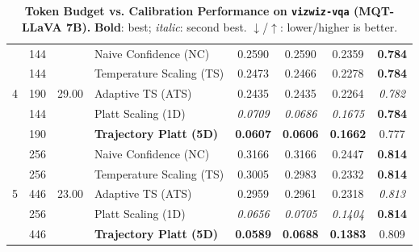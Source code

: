 \begin{table}[t]
\begin{tabular}{ccclcccc}
\multirow{5}{*}{4} & 144 & \multirow{5}{*}{29.00} & Naive Confidence (NC) & 0.2590 & 0.2590 & 0.2359 & \textbf{0.784} \\
 & 144 &  & Temperature Scaling (TS) & 0.2473 & 0.2466 & 0.2278 & \textbf{0.784} \\
 & 190 &  & Adaptive TS (ATS) & 0.2435 & 0.2435 & 0.2264 & \textit{0.782} \\
 & 144 &  & Platt Scaling (1D) & \textit{0.0709} & \textit{0.0686} & \textit{0.1675} & \textbf{0.784} \\
 & 190 &  & \textbf{Trajectory Platt (5D)} & \textbf{0.0607} & \textbf{0.0606} & \textbf{0.1662} & 0.777 \\
\midrule
\multirow{5}{*}{5} & 256 & \multirow{5}{*}{23.00} & Naive Confidence (NC) & 0.3166 & 0.3166 & 0.2447 & \textbf{0.814} \\
 & 256 &  & Temperature Scaling (TS) & 0.3005 & 0.2983 & 0.2332 & \textbf{0.814} \\
 & 446 &  & Adaptive TS (ATS) & 0.2959 & 0.2961 & 0.2318 & \textit{0.813} \\
 & 256 &  & Platt Scaling (1D) & \textit{0.0656} & \textit{0.0705} & \textit{0.1404} & \textbf{0.814} \\
 & 446 &  & \textbf{Trajectory Platt (5D)} & \textbf{0.0589} & \textbf{0.0688} & \textbf{0.1383} & 0.809 \\
\bottomrule
\end{tabular}
\caption{\textbf{Token Budget vs. Calibration Performance on \texttt{vizwiz-vqa} (MQT-LLaVA 7B).} \textbf{Bold}: best; \textit{italic}: second best. $\downarrow$/$\uparrow$: lower/higher is better.}
\label{tab:token_budget_vizwiz_vqa_mqt}
\end{table}

